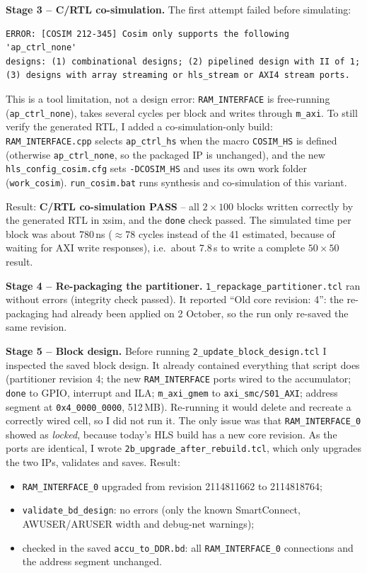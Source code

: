 \documentclass[11pt,a4paper]{article}
\newcommand{\code}[1]{\texttt{#1}}
\begin{document}
\textbf{Stage 3 -- C/RTL co-simulation.} The first attempt failed before simulating:
\begin{lstlisting}
ERROR: [COSIM 212-345] Cosim only supports the following 'ap_ctrl_none'
designs: (1) combinational designs; (2) pipelined design with II of 1;
(3) designs with array streaming or hls_stream or AXI4 stream ports.
\end{lstlisting}
This is a tool limitation, not a design error: \code{RAM\_INTERFACE} is free-running (\code{ap\_ctrl\_none}), takes several cycles per block and writes through \code{m\_axi}. To still verify the generated RTL, I added a co-simulation-only build: \code{RAM\_INTERFACE.cpp} selects \code{ap\_ctrl\_hs} when the macro \code{COSIM\_HS} is defined (otherwise \code{ap\_ctrl\_none}, so the packaged IP is unchanged), and the new \code{hls\_config\_cosim.cfg} sets \code{-DCOSIM\_HS} and uses its own work folder (\code{work\_cosim}). \code{run\_cosim.bat} runs synthesis and co-simulation of this variant.

Result: \textbf{C/RTL co-simulation PASS} -- all $2\times100$ blocks written correctly by the generated RTL in xsim, and the \code{done} check passed. The simulated time per block was about 780\,ns ($\approx$78 cycles instead of the 41 estimated, because of waiting for AXI write responses), i.e.\ about 7.8\,\textmu s to write a complete $50\times50$ result.

\textbf{Stage 4 -- Re-packaging the partitioner.} \code{1\_repackage\_partitioner.tcl} ran without errors (integrity check passed). It reported ``Old core revision: 4'': the re-packaging had already been applied on 2 October, so the run only re-saved the same revision.

\textbf{Stage 5 -- Block design.} Before running \code{2\_update\_block\_design.tcl} I inspected the saved block design. It already contained everything that script does (partitioner revision 4; the new \code{RAM\_INTERFACE} ports wired to the accumulator; \code{done} to GPIO, interrupt and ILA; \code{m\_axi\_gmem} to \code{axi\_smc/S01\_AXI}; address segment at \code{0x4\_0000\_0000}, 512\,MB). Re-running it would delete and recreate a correctly wired cell, so I did not run it. The only issue was that \code{RAM\_INTERFACE\_0} showed as \emph{locked}, because today's HLS build has a new core revision. As the ports are identical, I wrote \code{2b\_upgrade\_after\_rebuild.tcl}, which only upgrades the two IPs, validates and saves. Result:
\begin{itemize}[noitemsep]
  \item \code{RAM\_INTERFACE\_0} upgraded from revision 2114811662 to 2114818764;
  \item \code{validate\_bd\_design}: no errors (only the known SmartConnect, AWUSER/ARUSER width and debug-net warnings);
  \item checked in the saved \code{accu\_to\_DDR.bd}: all \code{RAM\_INTERFACE\_0} connections and the address segment unchanged.
\end{itemize}
\end{document}
